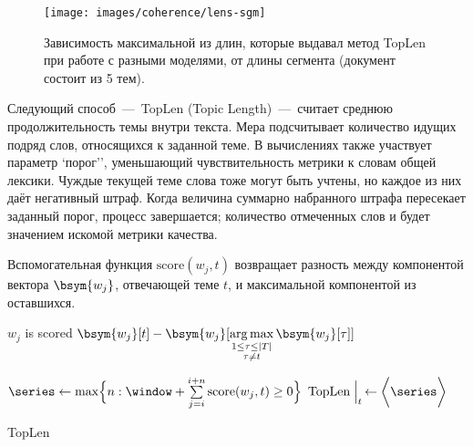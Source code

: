   
\begin{figure}[ht]
    \caption{Зависимость максимальной из длин, которые выдавал метод TopLen при работе с разными моделями, от длины сегмента (документ состоит из 5 тем).}
    \label{plot:lens-sgm}
    \texttt{[image: images/coherence/lens-sgm]}
  \end{figure}
 
Следующий способ~---~TopLen (Topic Length)~---~считает среднюю продолжительность темы внутри текста. Мера подсчитывает количество идущих подряд слов, относящихся к заданной теме. В вычислениях также участвует параметр `порог'', уменьшающий чувствительность метрики к словам общей лексики. Чуждые текущей теме слова тоже могут быть учтены, но каждое из них даёт негативный штраф. Когда величина суммарно набранного штрафа пересекает заданный порог, процесс завершается; количество отмеченных слов и будет значением искомой метрики качества.

Вспомогательная функция $\text{score}(w_j, t)$ возвращает разность между компонентой вектора $\bsym{w_j}$, отвечающей теме $t$, и максимальной компонентой из оставшихся.
  
  \begin{lrbox}{\algbox}
  \begin{minipage}{0.9\linewidth}
  \vspace{-1.5cm}
  \begin{algorithm}[H]
  \begin{algorithmic}[1]
    \State $w_j$ is scored
    \State \Return $\bsym{w_j}[t] - \bsym{w_j}[\underset{\substack{1 \leq \tau \leq |T|\\\tau \not= t}}{\operatorname{arg\,max}}\, \bsym{w_j}[\tau]]$
  \EndFunction
  \end{algorithmic}
  
  \begin{algorithmic}[1]
          \State $\series \gets \max\Bigl\{n : \window + \sum\limits_{j=i}^{i+n}\text{score}(w_j, t) \geq 0\Bigr\}$
        \EndIf
      \EndFor
    \EndFor
    \State $\text{TopLen}\Bigm|_{t}\, \gets \biggl\langle\series\biggr\rangle$
  \end{algorithmic}
  \caption{TopLen}
  \end{algorithm}
  \end{minipage}
  \end{lrbox}
  
